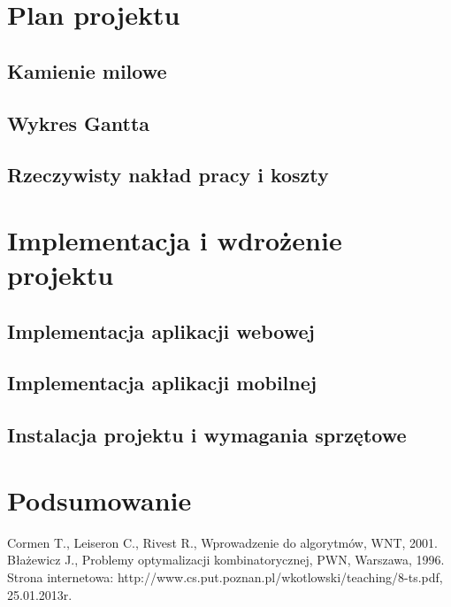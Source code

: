 \documentclass[a4paper,11pt]{article}
\begin{document}
\section{Plan projektu}
\subsection{Kamienie milowe}
\subsection{Wykres Gantta}
\subsection{Rzeczywisty nakład pracy i koszty} 
\section{Implementacja i wdrożenie projektu}
\subsection{Implementacja aplikacji webowej}
\subsection{Implementacja aplikacji mobilnej}
\subsection{Instalacja projektu i wymagania sprzętowe}
\section{Podsumowanie}

\newpage
\listoffigures
{} 
\newpage
\listoftables
{}
\newpage
\lstlistoflistings
{}


\newpage
{}
\begin{thebibliography}{9}
 Cormen T., Leiseron C., Rivest R., Wprowadzenie do algorytmów, WNT, 2001. 
 Błażewicz J., Problemy optymalizacji kombinatorycznej, PWN, Warszawa, 1996.
 Strona internetowa: http://www.cs.put.poznan.pl/wkotlowski/teaching/8-ts.pdf, 25.01.2013r.
\end{thebibliography}
\end{document}
